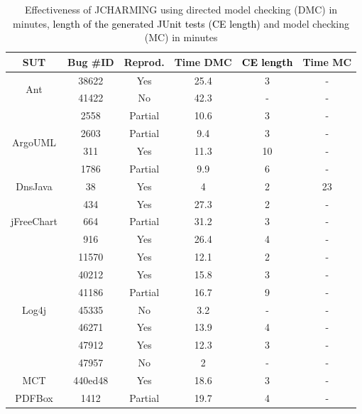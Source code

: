 \documentclass[times, doublespace]{smrauth}
\newcommand{\red}[1]{\textcolor{black}{#1}}
\begin{document}
{\begin{table}[H]
\centering
\caption{Effectiveness of JCHARMING using directed model checking (DMC) in minutes, \red{length of the generated JUnit tests (CE length)} and model checking (MC) in minutes}
\begin{tabular}{c|c|c|c|c|c}
SUT                         & Bug \#ID & Reprod. & Time DMC & \red{CE length} & Time MC \\ \hline \hline
\multirow{2}{*}{Ant}        & 38622    & Yes     & 25.4   & 3  & -       \\
                            & 41422    & No      & 42.3   & -  & -       \\ \hline
\multirow{4}{*}{ArgoUML}    & 2558     & Partial & 10.6   & 3  & -       \\
                            & 2603     & Partial & 9.4    & 3  & -       \\
                            & 311      & Yes     & 11.3   & 10  & -       \\
                            & 1786     & Partial & 9.9    & 6  & -       \\  \hline
DnsJava                     & 38       & Yes     & 4      & 2  & 23      \\ \hline
\multirow{3}{*}{jFreeChart} & 434      & Yes     & 27.3   & 2  & -       \\
                            & 664      & Partial & 31.2   & 3   & -       \\
                            & 916      & Yes     & 26.4   & 4  & -       \\ \hline
\multirow{7}{*}{Log4j}      & 11570    & Yes     & 12.1   & 2  & -       \\
                            & 40212    & Yes     & 15.8   & 3  & -       \\
                            & 41186    & Partial & 16.7   & 9  & -       \\
                            & 45335    & No      & 3.2    & -  & -       \\
                            & 46271    & Yes     & 13.9   & 4  & -       \\
                            & 47912    & Yes     & 12.3   & 3  & -       \\
                            & 47957    & No      & 2      & -  & -       \\ \hline
MCT                         & 440ed48  & Yes     & 18.6   & 3  & -       \\ \hline
\multirow{2}{*}{PDFBox}     & 1412     & Partial & 19.7   & 4  & -       \\

\end{tabular}
\end{table}}
\end{document}

